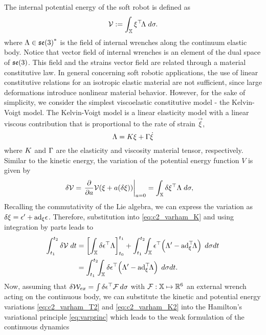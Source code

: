 The internal potential energy of the soft robot is defined as
\begin{equation}
\mathcal{V} := \int_{\mathbb{X}} {\xi}^\top\! {\Lambda} \;d\sigma.
\end{equation}
%
where ${\Lambda} \in {\mathfrak{se}(3)}^*$ is the field of internal wrenches along the continuum elastic body. Notice that vector field of internal wrenches is an element of the dual space of ${\mathfrak{se}(3)}$. This field and the strains vector field are related through a material constitutive law. In general concerning soft robotic applications, the use of linear constitutive relations for an isotropic elastic material are not sufficient, since large deformations introduce nonlinear material behavior. However, for the sake of simplicity, we consider the simplest viscoelastic constitutive model - the Kelvin-Voigt model. The Kelvin-Voigt model is a linear elasticity model with a linear viscous contribution that is proportional to the rate of strain $\vec{\xi}$,
% 
\begin{equation}
{\Lambda} = {K}{\xi} + {\Gamma} \dot{{\xi}}
\end{equation}
%
where ${K}$ and ${\Gamma}$ are the elasticity and viscosity material tensor, respectively. Similar to the kinetic energy, the variation of the potential energy function $V$ is given by
%
\begin{align}
\delta\mathcal{V} & = \left. \frac{\partial }{\partial a} \mathcal{V}({\xi} + a (\delta{\xi})) \right|_{a = 0} = \int_{\mathbb{X}} \delta{\xi}^\top \Lambda  \; d\sigma,
 \label{eq:c2_varham_K}
\end{align}
%
\noindent Recalling the commutativity of the Lie algebra, we can express the variation as $\delta{\xi} = {{\epsilon}}' + \text{ad}_{{\xi}} {\epsilon}$. Therefore, substitution into \eqref{eq:c2_varham_K} and using integration by parts leads to 
%
\begin{align}
\int_{t_1}^{t_2} \delta\mathcal{V} \; dt& = 
\left[ \int_\Xs\delta \vec{\epsilon}^\tr \Lambda  \right]_{t_0}^{t_1} +  \int_{t_1}^{t_2} \!\! \int_\Xs  \vec{\epsilon}^\tr \! \left( \Lambda' - \ad_{\vec{\xi}}^\tr \! \Lambda\right)\; d\sigma dt \notag \\ 
& = \int_{t_1}^{t_2} \!\! \int_\Xs \delta \vec{\epsilon}^\tr \!\left( \Lambda' - \ad_{\vec{\xi}}^\tr \! \Lambda \right)\;d\sigma dt\label{eq:c2_varham_K2}.
\end{align}
%
\noindent Now, assuming that $\delta \mathcal{W}_{ex} = \int \delta {\epsilon}^\top \mathcal{F} \, d \sigma $ with $\mathcal{F}: \mathbb{X} \mapsto \mathbb{R}^6$ an external wrench acting on the continuous body, we can substitute the kinetic and potential energy variations \eqref{eq:c2_varham_T2} and \eqref{eq:c2_varham_K2} into the Hamilton's variational principle \eqref{eq:varprinc} which leads to the weak formulation of the continuous dynamics
